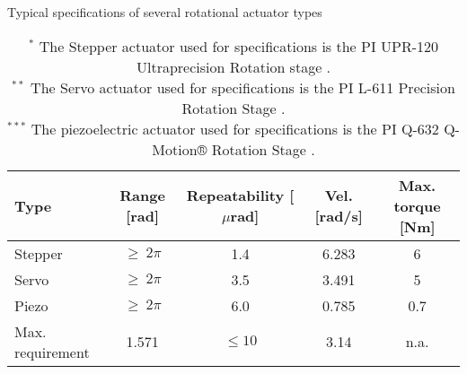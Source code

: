 \begin{table}[h] \centering \caption{Typical specifications of several rotational actuator types} \label{tab:rotationalactuators}
\begin{tabular}{l|cccc}
Type               & Range [rad] & Repeatability [$\mu$rad] & Vel. [rad/s] & Max. torque [Nm] \\ \hline
Stepper            & $\geq\ 2\pi$ & 1.4 & 6.283 & 6 \\
Servo              & $\geq\ 2\pi$ & 3.5 & 3.491 & 5 \\
Piezo              & $\geq\ 2\pi$ & 6.0 & 0.785 & 0.7 \\ \hline
Max. requirement   & 1.571        & $\leq 10$ & 3.14 & n.a.
\end{tabular}
\caption*{$^{*}$ The Stepper actuator used for specifications is the PI UPR-120 Ultraprecision Rotation stage \cite{UPR-120Stage}. \\ 
$^{**}$ The Servo actuator used for specifications is the PI L-611 Precision Rotation Stage \cite{L-611Stage}. \\ 
$^{***}$ The piezoelectric actuator used for specifications is the PI Q-632 Q-Motion® Rotation Stage \cite{Q-632Stage}.}
\end{table}





